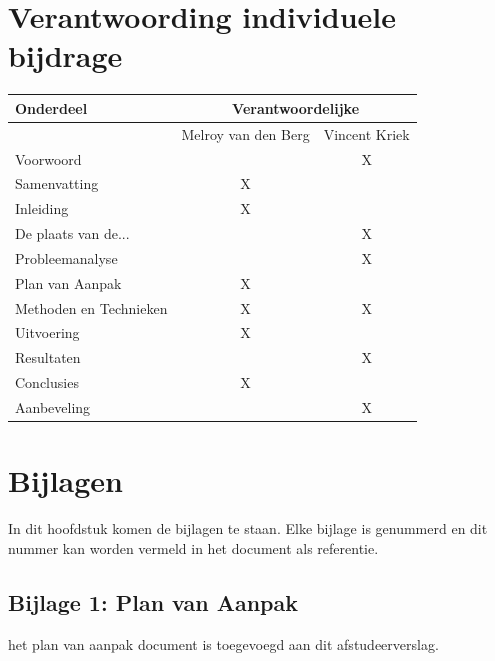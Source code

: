 \documentclass[]{article}
\begin{document}
\newpage
\section{Verantwoording individuele bijdrage}
\label{lastpage}

\begin{tabular}{|| l | c | c ||}\hline
    Onderdeel              &   \multicolumn{2}{|c||}{Verantwoordelijke} \\\hline
                           & Melroy van den Berg & Vincent Kriek        \\\hline\hline
    Voorwoord              &                     &  X                   \\\hline
    Samenvatting           &       X             &                      \\\hline
    Inleiding              &       X             &                      \\\hline
    De plaats van de...    &                     &  X                   \\\hline
    Probleemanalyse        &                     &  X                   \\\hline
    Plan van Aanpak        &       X             &                      \\\hline
    Methoden en Technieken &       X             &  X                   \\\hline
    Uitvoering             &       X             &                      \\\hline
    Resultaten             &                     &  X                   \\\hline
    Conclusies             &       X             &                      \\\hline
    Aanbeveling            &                     &  X                   \\\hline
\end{tabular}              

\newpage
\section{Bijlagen}
\label{lastpage}

In dit hoofdstuk komen de bijlagen te staan. Elke bijlage is genummerd en
dit nummer kan worden vermeld in het document als referentie.

\newpage
\pagestyle{empty}
\subsection*{Bijlage 1: Plan van Aanpak}
het plan van aanpak document is toegevoegd aan dit afstudeerverslag.
\end{document}
